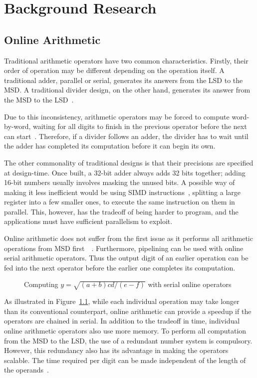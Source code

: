 \chapter{Background Research}

\section{Online Arithmetic}
Traditional arithmetic operators have two common characteristics.
Firstly, their order of operation may be different depending on the operation itself.
A traditional adder, parallel or serial, generates its answers from the LSD to the MSD.
A traditional divider design, on the other hand, generates its answer from the MSD to the LSD~\cite{Brent1}\cite{Srinivas1}.

Due to this inconsistency, arithmetic operators may be forced to compute word-by-word, waiting for all digits to finish in the previous operator before the next can start~\cite{Zhao1}.
Therefore, if a divider follows an adder, the divider has to wait until the adder has completed its computation before it can begin its own.

The other commonality of traditional designs is that their precisions are specified at design-time.
Once built, a 32-bit adder always adds 32 bits together; adding 16-bit numbers usually involves masking the unused bits.
A possible way of making it less inefficient would be using SIMD instructions~\cite{Duncan1}, splitting a large register into a few smaller ones, to execute the same instruction on them in parallel.
This, however, has the tradeoff of being harder to program, and the applications must have sufficient parallelism to exploit.

Online arithmetic does not suffer from the first issue as it performs all arithmetic operations from MSD first~\cite{Ercegovac1}~\cite{Ercegovac2}.
Furthermore, pipelining can be used with online serial arithmetic operators.
Thus the output digit of an earlier operation can be fed into the next operator before the earlier one completes its computation.

\begin{figure}[H]
  \centering
  
  \caption{Computing $y=\sqrt{(a+b)cd/(e-f)}$ with serial online operators~\cite{Ercegovac1}}
  \label{Online}
\end{figure}

As illustrated in Figure~\ref{Online}, while each individual operation may take longer than its conventional counterpart, online arithmetic can provide a speedup if the operators are chained in serial.
In addition to the tradeoff in time, individual online arithmetic operators also use more memory.
To perform all computation from the MSD to the LSD, the use of a redundant number system is compulsory.
However, this redundancy also has its advantage in making the operators scalable.
The time required per digit can be made independent of the length of the operands~\cite{Trivedi1}.

